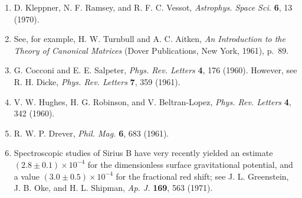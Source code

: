 \begin{enumerate}
  \item[8a.] \label{ch3-ref-8a}
  D. Kleppner, N. F. Ramsey, and R. F. C. Vessot,
  \emph{Astrophys. Space Sci.} \textbf{6}, 13 (1970).

  \item[9.] \label{ch3-ref-9}
  See, for example, H. W. Turnbull and A. C. Aitken,
  \emph{An Introduction to the Theory of Canonical Matrices}
  (Dover Publications, New York, 1961), p.~89.

  \item[10.] \label{ch3-ref-10}
  G. Cocconi and E. E. Salpeter,
  \emph{Phys. Rev. Letters} \textbf{4}, 176 (1960). However, see
  R. H. Dicke, \emph{Phys. Rev. Letters} \textbf{7}, 359 (1961).

  \item[11.] \label{ch3-ref-11}
  V. W. Hughes, H. G. Robinson, and V. Beltran-Lopez,
  \emph{Phys. Rev. Letters} \textbf{4}, 342 (1960).

  \item[12.] \label{ch3-ref-12}
  R. W. P. Drever, \emph{Phil. Mag.} \textbf{6}, 683 (1961).

  \item[13.] \label{ch3-ref-13}
  Spectroscopic studies of Sirius B have very recently yielded an estimate
  $(2.8\pm0.1)\times10^{-4}$ for the dimensionless surface gravitational
  potential, and a value $(3.0\pm0.5)\times10^{-4}$ for the fractional red
  shift; see J. L. Greenstein, J. B. Oke, and H. L. Shipman,
  \emph{Ap. J.} \textbf{169}, 563 (1971).
\end{enumerate}
